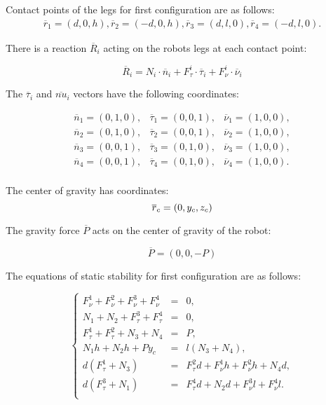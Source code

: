 \documentclass{ws-procs9x6}
\begin{document}
Contact points of the legs for first configuration are as follows:
\begin{equation}
  \begin{array}{l}
    \overline{r}_1 = (d,0,h),
    \overline{r}_2 = (-d,0,h),
    \overline{r}_3 = (d,l,0),
    \overline{r}_4 = (-d,l,0).
  \end{array}
\end{equation}

There is a reaction $\overline{R}_i$ acting on the robots legs at each contact point:

\begin{equation}
\overline{R}_i =  N_i\cdot\overline{n}_i+F^i_\tau\cdot\overline{\tau}_i+F^i_\nu\cdot\overline{\nu}_i
\end{equation}

The $\overline{\tau}_i$ and $\overline{nu}_i$ vectors have the following coordinates:

\begin{equation}
\begin{array}{ccc}
  \overline{n}_1 = (0,1,0), & \overline{\tau}_1 = (0,0,1),& \overline{\nu}_1 = (1,0,0),\\
  \overline{n}_2 = (0,1,0), & \overline{\tau}_2 = (0,0,1),& \overline{\nu}_2 = (1,0,0),\\
  \overline{n}_3 = (0,0,1), & \overline{\tau}_3 = (0,1,0),& \overline{\nu}_3 = (1,0,0),\\
  \overline{n}_4 = (0,0,1), & \overline{\tau}_4 = (0,1,0),& \overline{\nu}_4 = (1,0,0).\\
\end{array}
\end{equation}

The center of gravity has coordinates:
\begin{equation}
  \overline{r}_c = (0,y_c,z_c)\\
\end{equation}

The gravity force $\overline{P}$ acts on the center of gravity of the robot:

\begin{equation}
\overline{P} = (0,0,-P)
\end{equation}

The equations of static stability for first configuration are as follows:

\begin{equation}
\label{eq:case1_initial}
\left\{
  \begin{array}{rcl}
    F_\nu^1 + F_\nu^2 + F_\nu^3 + F_\nu^4 &=& 0, \\
    N_1 + N_2 + F_\tau^3 + F_\tau^4 &=& 0, \\
    F_\tau^1 + F_\tau^2 + N_3 + N_4 &=& P, \\
    N_1h + N_2h + Py_c &=& l(N_3 + N_4), \\
    d(F_\tau^1 + N_3) &=& F_\tau^2d + F_\nu^1h + F_\nu^2h + N_4d, \\
    d(F_\tau^3 + N_1) &=& F_\tau^4d + N_2d +F_\nu^3l + F_\nu^4l.\\
  \end{array}
\right.
\end{equation}
\end{document}
